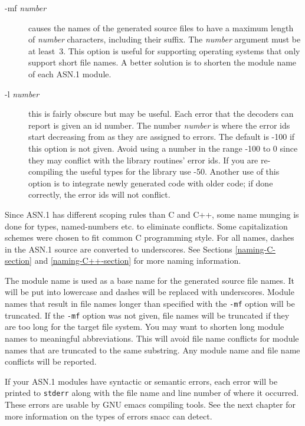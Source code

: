 \begin{description}
\item[-mf {\em number}] {causes the names of the generated source
files to have a maximum length of {\em number} characters, including
their suffix.  The {\em number} argument must be at least~3.  This option
is useful for supporting operating systems that only support short
file names.  A better solution is to shorten the module name of each
ASN.1 module.}

\item[-l {\em number}] {this is fairly obscure but may be useful.  Each
error that the decoders can report is given an id number.  The number
{\em number} is where the error ids start decreasing from as they are
assigned to errors.  The default is -100 if this option is not given.
Avoid using a number in the range -100 to 0 since they may conflict
with the library routines' error ids.  If you are re-compiling the
useful types for the library use -50.  Another use of this option is
to integrate newly generated code with older code; if done correctly,
the error ids will not conflict.}

\end{description}

Since ASN.1 has different scoping rules than C and C++, some name munging
is done for types, named-numbers etc. to eliminate conflicts.
Some capitalization schemes were chosen to fit common C programming
style.  For all names, dashes in the ASN.1 source are converted to
underscores.  See Sections \ref{naming-C-section} and \ref{naming-C++-section}
for more naming information.

The module name is used as a base name for the generated source file
names.  It will be put into lowercase and dashes will be replaced with
underscores.  Module names that result in file names longer than
specified with the \verb$-mf$ option will be truncated.  If the
\verb$-mf$ option was not given, file names will be truncated if they
are too long for the target file system. You may want to shorten long
module names to meaningful abbreviations. This will avoid file name
conflicts for module names that are truncated to the same substring.
Any module name and file name conflicts will be reported.

If your ASN.1 modules have syntactic or semantic errors, each error
will be printed to \verb$stderr$ along with the file name and line number of
where it occurred. These errors are usable by GNU emacs compiling
tools.  See the next chapter for more information on the types of
errors snacc can detect.

